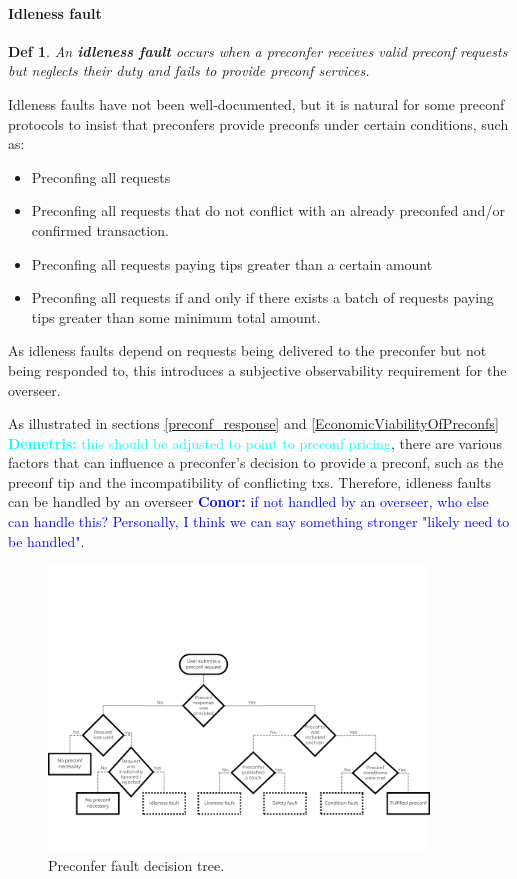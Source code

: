 \documentclass[a4paper]{article}
\theoremstyle{boldstyle}
\newtheorem*{definitionx}{Def}
\newenvironment{definition}
  {\begin{defopenboxq}\begin{definitionx}}
  {\end{definitionx}\end{defopenboxq}}
\newcommand{\cm}[1]{\textcolor{blue}{\textbf{Conor:} #1}}
\newcommand{\dk}[1]{\textcolor{cyan}{\textbf{Demetris:} #1}}
\begin{document}
    \paragraph{Idleness fault}
        \begin{definition}
            An \textbf{idleness fault} occurs when a preconfer receives valid preconf requests but neglects their duty and fails to provide preconf services.
        \end{definition}
       Idleness faults have not been well-documented, but it is natural for some preconf protocols to insist that preconfers provide preconfs under certain conditions, such as:
        \begin{itemize}
            \item Preconfing all requests
            \item Preconfing all requests that do not conflict with an already preconfed and/or confirmed transaction.
            \item Preconfing all requests paying tips greater than a certain amount
            \item Preconfing all requests if and only if there exists a batch of requests paying tips greater than some minimum total amount. 
            
        \end{itemize}
        As idleness faults depend on requests being delivered to the preconfer but not being responded to, this introduces a subjective observability requirement for the overseer.
        
        As illustrated in sections \ref{preconf_response} and \ref{EconomicViabilityOfPreconfs} \dk{this should be adjusted to point to preconf pricing}, there are various factors that can influence a preconfer's decision to provide a preconf, such as the preconf tip and the incompatibility of conflicting txs. Therefore, idleness faults can be handled by an overseer \cm{if not handled by an overseer, who else can handle this? Personally, I think we can say something stronger "likely need to be handled"}.

    \begin{figure}[htbp]
        \centering
        \includegraphics[width=0.9\textwidth]{figures/preconferFaultDecisionTree.png}
        \caption{Preconfer fault decision tree.}
        \label{preconfer fault tree}
    \end{figure}
    
\end{document}
